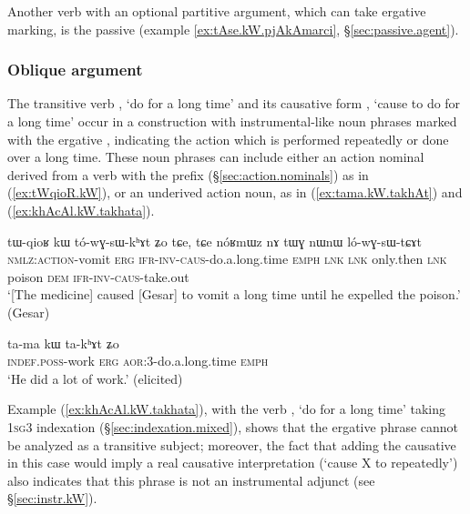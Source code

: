 Another verb with an optional partitive argument, which can take ergative marking, is the passive  (example \ref{ex:tAse.kW.pjAkAmarci}, §\ref{sec:passive.agent}).


\subsubsection{Oblique argument} \label{sec:oblique.kW}
The transitive verb , `do for a long time' and its causative form , `cause to do for a long time' occur in a construction with instrumental-like noun phrases marked with the ergative , indicating the action which is performed repeatedly or done over a long time. These noun phrases can include either an action nominal derived from a verb with the prefix  (§\ref{sec:action.nominals}) as in (\ref{ex:tWqioR.kW}), or an underived action noun, as in (\ref{ex:tama.kW.takhAt}) and (\ref{ex:khAcAl.kW.takhata}).  
 
  \begin{exe}
\ex \label{ex:tWqioR.kW}
\gll tɯ-qioʁ kɯ tó-wɣ-sɯ-kʰɤt ʑo tɕe, tɕe nóʁmɯz nɤ tɯɣ nɯnɯ ló-wɣ-sɯ-tɕɤt  \\
\textsc{nmlz}:\textsc{action}-vomit \textsc{erg} \textsc{ifr}-\textsc{inv}-\textsc{caus}-do.a.long.time \textsc{emph} \textsc{lnk} \textsc{lnk} only.then \textsc{lnk} poison \textsc{dem} \textsc{ifr}-\textsc{inv}-\textsc{caus}-take.out \\
\glt `[The medicine] caused [Gesar] to vomit a long time until he expelled the poison.' (Gesar)
\end{exe}

  \begin{exe}
\ex \label{ex:tama.kW.takhAt}
\gll ta-ma kɯ ta-kʰɤt ʑo  \\
\textsc{indef}.\textsc{poss}-work \textsc{erg} \textsc{aor}:3\flobv{}-do.a.long.time \textsc{emph} \\
\glt `He did a lot of work.' (elicited)
\end{exe}

Example (\ref{ex:khAcAl.kW.takhata}), with the verb , `do for a long time'  taking \textsc{1sg}\fl{}3 indexation (§\ref{sec:indexation.mixed}), shows that the ergative phrase cannot be analyzed as a transitive subject; moreover, the fact that adding the causative in this case would imply a real causative interpretation (`cause X to repeatedly') also indicates that this phrase is not an instrumental adjunct (see §\ref{sec:instr.kW}).

